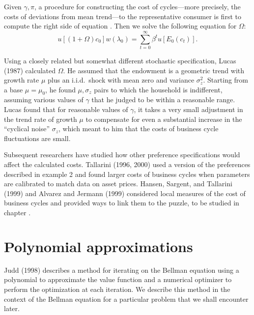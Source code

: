   Given $\gamma, \pi$, a procedure for constructing the cost of cycles---more
precisely, the costs of deviations from mean trend---to the
representative consumer is first to compute the right side
of equation .
Then we solve the following equation for $\Omega$:
$$ u[(1+  \Omega)c_0] w(\lambda_0) =
          \sum_{t=0}^\infty \beta^t u[E_0(c_t)].  $$


    Using a closely related but somewhat different stochastic
specification, Lucas (1987)   calculated $\Omega$.  He assumed
that   the endowment is a geometric trend with
growth rate $\mu$ plus an i.i.d.\ shock with
mean zero and variance $\sigma_z^2$.  Starting
from a base $\mu = \mu_0$, he  found
$\mu, \sigma_z$ pairs to which the household
is indifferent, assuming
various values of $\gamma$ that he judged to be within a reasonable
range.  Lucas found that  for reasonable
values of $\gamma$, it takes a very small
adjustment in the trend rate of growth
$\mu$ to compensate for even a substantial increase
in the ``cyclical noise'' $\sigma_z$, which meant to him
that the costs of business cycle fluctuations are small.

 Subsequent researchers have studied
how other preference specifications   would affect the calculated
costs.  Tallarini (1996, 2000) used a version of the preferences
described in example 2 and found larger costs of business cycles
when parameters are calibrated to match data on asset prices.
Hansen, Sargent, and Tallarini (1999) and Alvarez and Jermann
(1999) considered local measures of the cost of business cycles
and provided ways to link them to the  puzzle,
to be studied in chapter
.
   

\section{Polynomial approximations}
Judd (1998) describes a method for iterating on the Bellman
equation  using a polynomial to approximate the value function and
a numerical optimizer  to perform the optimization at each
iteration. We describe this method in the context of the Bellman
equation for a  particular problem that we shall encounter later.


